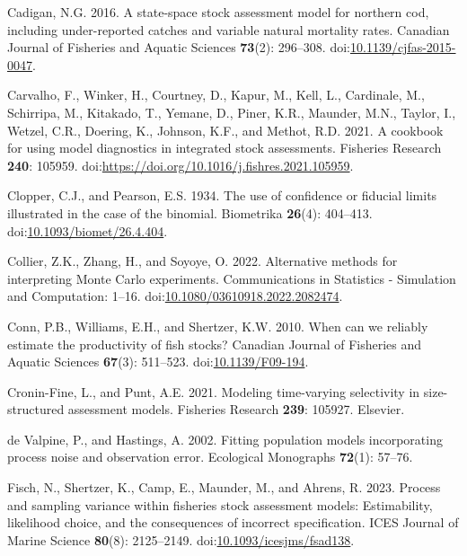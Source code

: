 \begin{CSLReferences}{1}{0}
Cadigan, N.G. 2016. A state-space stock assessment model for northern
cod, including under-reported catches and variable natural mortality
rates. Canadian Journal of Fisheries and Aquatic Sciences
\textbf{73}(2): 296--308.
doi:\href{https://doi.org/10.1139/cjfas-2015-0047}{10.1139/cjfas-2015-0047}.

Carvalho, F., Winker, H., Courtney, D., Kapur, M., Kell, L., Cardinale,
M., Schirripa, M., Kitakado, T., Yemane, D., Piner, K.R., Maunder, M.N.,
Taylor, I., Wetzel, C.R., Doering, K., Johnson, K.F., and Methot, R.D.
2021. A cookbook for using model diagnostics in integrated stock
assessments. Fisheries Research \textbf{240}: 105959.
doi:\url{https://doi.org/10.1016/j.fishres.2021.105959}.

Clopper, C.J., and Pearson, E.S. 1934. The use of confidence or fiducial
limits illustrated in the case of the binomial. Biometrika
\textbf{26}(4): 404--413.
doi:\href{https://doi.org/10.1093/biomet/26.4.404}{10.1093/biomet/26.4.404}.

Collier, Z.K., Zhang, H., and Soyoye, O. 2022. Alternative methods for
interpreting {M}onte {C}arlo experiments. Communications in Statistics -
Simulation and Computation: 1--16.
doi:\href{https://doi.org/10.1080/03610918.2022.2082474}{10.1080/03610918.2022.2082474}.

Conn, P.B., Williams, E.H., and Shertzer, K.W. 2010. When can we
reliably estimate the productivity of fish stocks? Canadian Journal of
Fisheries and Aquatic Sciences \textbf{67}(3): 511--523.
doi:\href{https://doi.org/10.1139/F09-194}{10.1139/F09-194}.

Cronin-Fine, L., and Punt, A.E. 2021. Modeling time-varying selectivity
in size-structured assessment models. Fisheries Research \textbf{239}:
105927. Elsevier.

{de Valpine, P., and Hastings, A.} 2002. Fitting population models
incorporating process noise and observation error. Ecological Monographs
\textbf{72}(1): 57--76.

Fisch, N., Shertzer, K., Camp, E., Maunder, M., and Ahrens, R. 2023.
Process and sampling variance within fisheries stock assessment models:
Estimability, likelihood choice, and the consequences of incorrect
specification. ICES Journal of Marine Science \textbf{80}(8):
2125--2149.
doi:\href{https://doi.org/10.1093/icesjms/fsad138}{10.1093/icesjms/fsad138}.


\end{CSLReferences}
